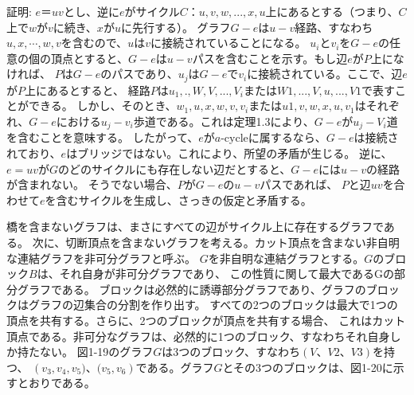 
証明: $e＝uv$とし、逆に$e$がサイクル$C：u, v, w, ..., x, u$上にあるとする（つまり、$C$上で$w$が$v$に続き、$x$が$u$に先行する）。
グラフ$G-e$は$u-v$経路、すなわち$u, x, \cdots, w, v$を含むので、$u$は$v$に接続されていることになる。
$u_i$と$v_i$を$G-e$の任意の個の頂点とすると、$G-e$は$u-v$パスを含むことを示す。もし辺$e$が$P$上になければ、
$P$は$G-e$のパスであり、$u_j$は$G-e$で$v_i$に接続されている。ここで、辺$e$が$P$上にあるとすると、
経路$P$は$u_1, ., W, V, ..., V_i$または$W1, ..., V, u, ..., V1$で表すことができる。
しかし、そのとき、$w_1, u, x, w, v, v_i$または$u1, v, w, x, u, v_1$はそれぞれ、$G-e$における$u_j-v_i$歩道である。これは定理1.3により、$G-e$が$u_j-V_i$道を含むことを意味する。
したがって、$e$が$a$-cycleに属するなら、$G-e$は接続されており、$e$はブリッジではない。これにより、所望の矛盾が生じる。
逆に、$e = uv$が$G$のどのサイクルにも存在しない辺だとすると、$G-e$には$u-v$の経路が含まれない。
そうでない場合、$P$が$G-e$の$u-v$パスであれば、
$P$と辺$uv$を合わせて$e$を含むサイクルを生成し、さっきの仮定と矛盾する。

橋を含まないグラフは、まさにすべての辺がサイクル上に存在するグラフである。
次に、切断頂点を含まないグラフを考える。カット頂点を含まない非自明な連結グラフを非可分グラフと呼ぶ。
$G$を非自明な連結グラフとする。$G$のブロック$B$は、それ自身が非可分グラフであり、
この性質に関して最大であるGの部分グラフである。
ブロックは必然的に誘導部分グラフであり、グラフのブロックはグラフの辺集合の分割を作り出す。
すべての2つのブロックは最大で1つの頂点を共有する。さらに、2つのブロックが頂点を共有する場合、
これはカット頂点である。非可分なグラフは、必然的に1つのブロック、すなわちそれ自身しか持たない。
図1-19のグラフ$G$は3つのブロック、すなわち$({V、V2、V3})$を持つ、
$({v_3,v_4,v_5)、(v_5,v_6})$である。グラフ$G$とその3つのブロックは、図1-20に示すとおりである。